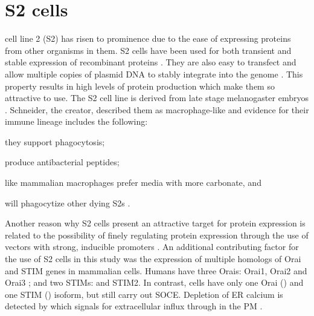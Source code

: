 \section{\droso{} S2 cells}
\droso{} cell line 2 (S2) has risen to prominence due to the ease of expressing proteins from other organisms in them. S2 cells have been used for both transient and stable expression of recombinant proteins \citep{Schetz2004}. They are also easy to transfect and allow multiple copies of plasmid DNA to stably integrate into the genome \citep{Schetz2004}. This property results in high levels of protein production which make them so attractive to use. 
The S2 cell line is derived from late stage \droso{} melanogaster embryos \citep{Schneider1972, Schetz2004}. Schneider, the creator, described them as macrophage-like \citep{Schetz2004} and evidence for their immune lineage includes the following: 
\begin{inparaenum}[(i)] 
\item they support phagocytosis;  %
\item produce antibacterial peptides;  %
\item like mammalian macrophages prefer media with more carbonate, and  %
\item will phagocytize other dying S2s \citep{Schetz2004}.
\end{inparaenum} 

Another reason why S2 cells present an attractive target for protein expression is related to the possibility of finely regulating protein expression through the use of vectors with strong, inducible promoters \citep{Schetz2004,Yagodin1999}. An additional contributing factor for the use of S2 cells in this study was the expression of multiple homologs of Orai and STIM genes in mammalian cells. Humans  have three Orais: Orai1, Orai2 and Orai3%
; and two STIMs: \stim{} and STIM2. %
In contrast, \droso{} cells have only one Orai (\dorai) and one STIM (\dstim) isoform, but  still carry out SOCE. Depletion of ER calcium is detected by \dstim{} which signals for extracellular \Ca{} influx through \dorai{} in the PM \citep{Smyth2010}.


